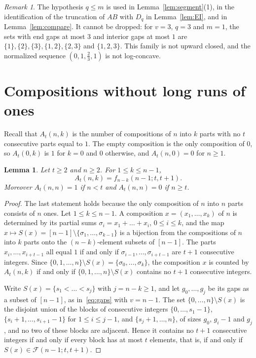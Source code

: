 \documentclass{amsart}
\newtheorem{lemma}[theorem]{Lemma}
\theoremstyle{definition}
\theoremstyle{remark}
\newtheorem{remark}[theorem]{Remark}
\numberwithin{equation}{section}
\newcommand{\cF}{\mathcal{F}}
\begin{document}
\begin{remark}\label{rem:qm}
The hypothesis $q\le m$ is used in Lemma~\ref{lem:segment}(1), in the identification of the truncation of $AB$ with $D_q$ in Lemma~\ref{lem:EI}, and in Lemma~\ref{lem:compare}. It cannot be dropped: for $v=3$, $q=3$ and $m=1$, the sets with end gaps at most $3$ and interior gaps at most $1$ are $\{1\},\{2\},\{3\},\{1,2\},\{2,3\}$ and $\{1,2,3\}$. This family is not upward closed, and the normalized sequence $(0,1,\tfrac23,1)$ is not log-concave.
\end{remark}

\section{Compositions without long runs of ones}\label{sec:comp}

Recall that $A_t(n,k)$ is the number of compositions of $n$ into $k$ parts with no $t$ consecutive parts equal to $1$. The empty composition is the only composition of $0$, so $A_t(0,k)$ is $1$ for $k=0$ and $0$ otherwise, and $A_t(n,0)=0$ for $n\ge1$.

\begin{lemma}\label{lem:comp}
Let $t\ge2$ and $n\ge2$. For $1\le k\le n-1$,
\[
A_t(n,k)=f_{n-k}(n-1;t,t+1).
\]
Moreover $A_t(n,n)=1$ if $n<t$ and $A_t(n,n)=0$ if $n\ge t$.
\end{lemma}

\begin{proof}
The last statement holds because the only composition of $n$ into $n$ parts consists of $n$ ones. Let $1\le k\le n-1$. A composition $x=(x_1,\dots,x_k)$ of $n$ is determined by its partial sums $\sigma_i=x_1+\dots+x_i$, $0\le i\le k$, and the map $x\mapsto S(x)=[n-1]\setminus\{\sigma_1,\dots,\sigma_{k-1}\}$ is a bijection from the compositions of $n$ into $k$ parts onto the $(n-k)$-element subsets of $[n-1]$. The parts $x_i,\dots,x_{i+t-1}$ all equal $1$ if and only if $\sigma_{i-1},\dots,\sigma_{i+t-1}$ are $t+1$ consecutive integers. Since $\{0,1,\dots,n\}\setminus S(x)=\{\sigma_0,\dots,\sigma_k\}$, the composition $x$ is counted by $A_t(n,k)$ if and only if $\{0,1,\dots,n\}\setminus S(x)$ contains no $t+1$ consecutive integers.

Write $S(x)=\{s_1<\dots<s_j\}$ with $j=n-k\ge1$, and let $g_0,\dots,g_j$ be its gaps as a subset of $[n-1]$, as in~\eqref{eq:gaps} with $v=n-1$. The set $\{0,\dots,n\}\setminus S(x)$ is the disjoint union of the blocks of consecutive integers $\{0,\dots,s_1-1\}$, $\{s_i+1,\dots,s_{i+1}-1\}$ for $1\le i\le j-1$, and $\{s_j+1,\dots,n\}$, of sizes $g_0$, $g_i-1$ and $g_j$, and no two of these blocks are adjacent. Hence it contains no $t+1$ consecutive integers if and only if every block has at most $t$ elements, that is, if and only if $S(x)\in\cF(n-1;t,t+1)$.
\end{proof}
\end{document}
